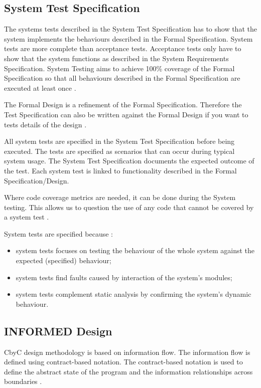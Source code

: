 \subsection{System Test Specification}

The systems tests described in the System Test Specification has to show that the system implements the 
behaviours described in the Formal Specification. System tests are more complete than 
acceptance tests. Acceptance tests only have to show that the system functions as described in the 
System Requirements Specification. System Testing aims to achieve 100\% coverage of the Formal 
Specification so that all behaviours described in the Formal Specification are executed at least once \parencite{Tokeneer}.

The Formal Design is a refinement of the Formal Specification. Therefore the Test
Specification can also be written against the Formal Design if you want to tests 
details of the design \parencite{Tokeneer}.

All system tests are specified in the System Test Specification before being executed.
The tests are specified as scenarios that can occur during typical system usage. 
The System Test Specification documents the expected outcome of the test. 
Each system test is linked to functionality described in the Formal Specification/Design\parencite{Tokeneer}.

Where code coverage metrics are needed, it can be done during the System testing. 
This allows us to question the use of any code that cannot be covered
by a system test \parencite{Tokeneer}.

System tests are specified because \parencite{Tokeneer}:
\begin{itemize}
	\item system tests focuses on testing the behaviour of the whole system against
		the expected (specified) behaviour;
	\item system tests find faults caused by interaction of the system's modules;
	\item system tests complement static analysis by confirming the system's dynamic behaviour.
\end{itemize}

\subsection{INFORMED Design}
CbyC design methodology is based on information flow. The information flow is 
defined using contract-based notation. The contract-based notation is used to
define the abstract state of the program and the information relationships across
boundaries \parencite{CbyCMan}.

